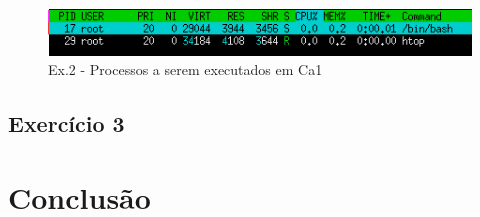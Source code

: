 \documentclass[a4paper]{report}
\begin{document}
\begin{figure}[H]
    \centering 
    \includegraphics[width=\textwidth]{images/htopca1.png}
    \caption{Ex.2 - Processos a serem executados em Ca1}
    \label{fig:htopca1}
\end{figure}

\section{Exercício 3}

\chapter{Conclusão}
\end{document}
